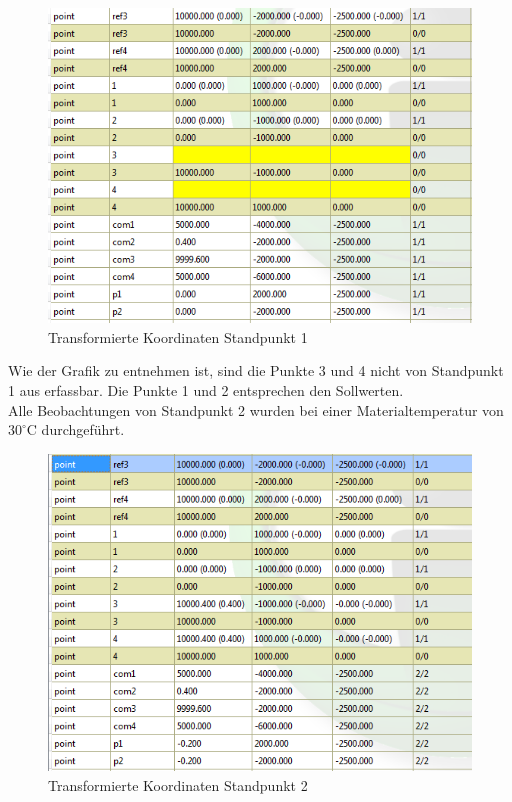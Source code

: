 \begin{figure}[H]
\label{fig:s1transformiert}
\centering
	\includegraphics[scale=2.0]{bilder/Testmessung/zylinder/s1transformiert}
	\caption{Transformierte Koordinaten Standpunkt 1}
\end{figure}

Wie der Grafik zu entnehmen ist, sind die Punkte 3 und 4 nicht von Standpunkt 1 aus erfassbar. Die Punkte 1 und 2 entsprechen den Sollwerten.\\
Alle Beobachtungen von Standpunkt 2 wurden bei einer Materialtemperatur von $30^\circ\text{C}$ durchgeführt. 

\begin{figure}[H]
\label{fig:s2transformiert}
\centering
	\includegraphics[scale=2.0]{bilder/Testmessung/zylinder/3u4ohneMovement}
	\caption{Transformierte Koordinaten Standpunkt 2}
\end{figure}


